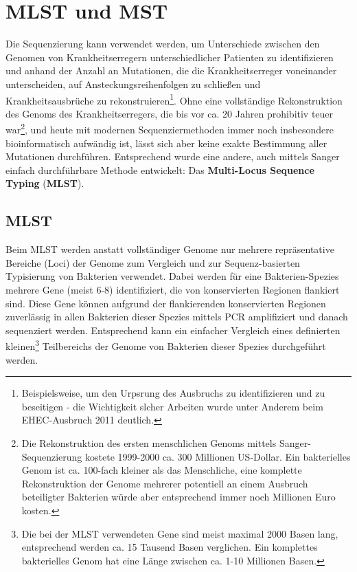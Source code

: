 \section{MLST und MST}

Die Sequenzierung kann verwendet werden, um Unterschiede zwischen den Genomen von Krankheitserregern unterschiedlicher Patienten zu identifizieren und anhand der Anzahl an Mutationen, die die Krankheitserreger voneinander unterscheiden, auf Ansteckungsreihenfolgen zu schließen und Krankheitsausbrüche zu rekonstruieren\footnote{Beispielsweise, um den Urpsrung des Ausbruchs zu identifizieren und zu beseitigen - die Wichtigkeit slcher Arbeiten wurde unter Anderem beim EHEC-Ausbruch 2011 deutlich.}. Ohne eine vollständige Rekonstruktion des Genoms des Krankheitserregers, die bis vor ca. 20 Jahren prohibitiv teuer war\footnote{Die Rekonstruktion des ersten menschlichen Genoms mittels Sanger-Sequenzierung kostete 1999-2000 ca. 300 Millionen US-Dollar. Ein bakterielles Genom ist ca. 100-fach kleiner als das Menschliche, eine komplette Rekonstruktion der Genome mehrerer potentiell an einem Ausbruch beteiligter Bakterien würde aber entsprechend immer noch Millionen Euro kosten.}, und heute mit modernen Sequenziermethoden immer noch insbesondere bioinformatisch aufwändig ist, lässt sich aber keine exakte Bestimmung aller Mutationen durchführen. Entsprechend wurde eine andere, auch mittels Sanger einfach durchführbare Methode entwickelt: Das \textbf{Multi-Locus Sequence Typing} (\textbf{MLST}).

\subsection{MLST}

Beim MLST werden anstatt vollständiger Genome nur mehrere repräsentative Bereiche (Loci) der Genome zum Vergleich und zur Sequenz-basierten Typisierung von Bakterien verwendet. Dabei werden für eine Bakterien-Spezies mehrere Gene (meist 6-8) identifiziert, die von konservierten Regionen flankiert sind. Diese Gene können aufgrund der flankierenden konservierten Regionen zuverlässig in allen Bakterien dieser Spezies mittels PCR amplifiziert und danach sequenziert werden. Entsprechend kann ein einfacher Vergleich eines definierten kleinen\footnote{Die bei der MLST verwendeten Gene sind meist maximal 2000 Basen lang, entsprechend werden ca. 15 Tausend Basen verglichen. Ein komplettes bakterielles Genom hat eine Länge zwischen ca. 1-10 Millionen Basen.} Teilbereichs der Genome von Bakterien dieser Spezies durchgeführt werden.  

